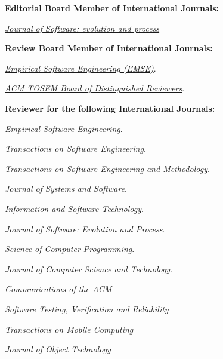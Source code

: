 \documentclass[10pt]{article}
\begin{document}
\textbf{Editorial Board Member of International Journals:}
\begin{innerlist}
\item \emph{\href{http://onlinelibrary.wiley.com/journal/10.1002/(ISSN)2047-7481}{Journal of Software: evolution and process}}
\end{innerlist}

\textbf{Review Board Member of International Journals:}
\begin{innerlist}
   \item \emph{
              \href{}
                   {Empirical Software Engineering (EMSE)}}.
   \item \emph{
              \href{}
                   {ACM TOSEM Board of Distinguished Reviewers}}.\\
\end{innerlist}




\textbf{Reviewer for the following International Journals:}
\begin{innerlist}
\item \emph{Empirical Software Engineering}.
\item \emph{Transactions on Software Engineering}.
\item \emph{ Transactions on Software Engineering and Methodology}.
\item \emph{Journal of Systems and Software}.
\item \emph{Information and Software Technology}.
\item \emph{Journal of Software: Evolution and Process}.
\item \emph{Science of Computer Programming}.
\item \emph{Journal of Computer Science and Technology}.
\item \emph{Communications of the ACM}
\item \emph{Software Testing, Verification and Reliability}
\item \emph{Transactions on Mobile Computing }
\item \emph{Journal of Object Technology}\\
\end{innerlist} 

\end{document}

